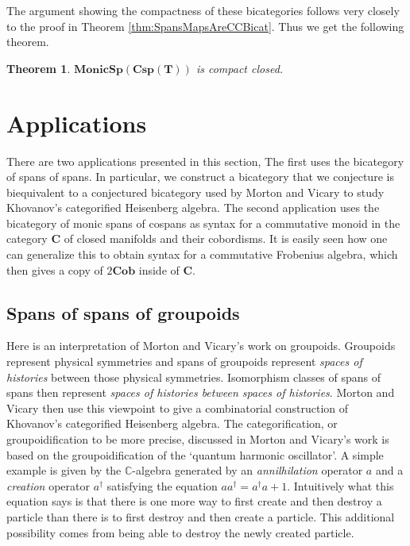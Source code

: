 \documentclass[11pt]{amsart}
\newcommand{\cat}[1]{\mathbf{#1}}
\newcommand{\bimonspcsp}[1]{\mathbf{MonicSp(Csp(#1))}}
\newtheorem{thm}{Theorem}[section]
\theoremstyle{remark}
\theoremstyle{definition}
\begin{document}
The argument showing the compactness 
of these bicategories follows very closely 
to the proof in Theorem \ref{thm:SpansMapsAreCCBicat}. 
Thus we get the following theorem.

\begin{thm}
	\label{thm:SpansCospansAreCCBicat}
	$\bimonspcsp{T}$ is compact closed.
\end{thm}

\section{Applications} %
\label{sec:Applications}

There are two applications presented in this section, 
The first uses the bicategory of spans of spans.  
In particular, we construct a bicategory that 
we conjecture is biequivalent to a conjectured bicategory 
used by Morton and Vicary 
	\cite{MortVic} 
to study Khovanov's categorified Heisenberg algebra.  
The second application uses the bicategory of 
monic spans of cospans as syntax for a 
commutative monoid in the category $\cat{C}$ of 
closed manifolds and their cobordisms. 
It is easily seen how one can generalize this to 
obtain syntax for a commutative Frobenius algebra, 
which then gives a copy of $2\cat{Cob}$ inside of $\cat{C}$.   

\subsection{Spans of spans of groupoids} %
\label{subsec:SpanSpanGroupoid}

Here is an interpretation of Morton and 
Vicary's \cite{MortVic} work on groupoids. 
Groupoids represent physical symmetries and 
spans of groupoids represent 
\emph{spaces of histories} between those physical symmetries. 
Isomorphism classes of spans of spans then represent 
\emph{spaces of histories between spaces of histories}.
Morton and Vicary then use this viewpoint to 
give a combinatorial construction of 
Khovanov's categorified Heisenberg algebra. 
The categorification, or groupoidification to be more precise, 
discussed in Morton and Vicary's work is based on the 
groupoidification of the `quantum harmonic oscillator'. 
A simple example is given by the $\mathbb{C}$-algebra 
generated by an \emph{annilhilation} operator $a$ and 
a \emph{creation} operator $a^\dagger$ satisfying 
the equation $aa^\dagger=a^\dagger a+1$. 
Intuitively what this equation says is that there is 
one more way to first create and then destroy a particle 
than there is to first destroy and then create a particle. 
This additional possibility comes from being able to destroy
the newly created particle.
\end{document}

